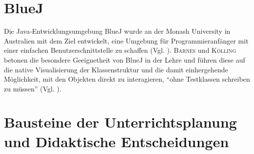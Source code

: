 \documentclass[paper=a4, DIV=13, BCOR=12mm, twoside=on, onecolumn=on, open = any, titlepage =on, parskip =half-, headsepline = on, footsepline = on, chapterprefix = on, sectionprefix = on, appendixprefix = off, fontsize = 11pt, numbers = noenddot, abstract = off]{scrreprt}
\begin{document}
 \section{BlueJ}
\onehalfspacing
{}
\label{sec:bluej}
Die Java-Entwicklungsumgebung BlueJ wurde an der Monash University in Australien mit dem Ziel entwickelt, eine Umgebung für Programmieranfänger mit einer einfachen Benutzerschnittstelle zu schaffen (Vgl. \cite[S.14]{barnes:03}). \textsc{Barnes} und \textsc{Kölling} betonen die besondere Geeignetheit von BlueJ in der Lehre und führen diese auf die native Visualisierung der Klassenstruktur und die damit einhergehende Möglichkeit, mit den Objekten direkt zu interagieren, "`ohne Testklassen schreiben zu müssen"' (Vgl. \cite[S.15]{barnes:03}). 



\par \singlespacing
 \section{Bausteine der Unterrichtsplanung und Didaktische Entscheidungen}
\onehalfspacing
\end{document}
